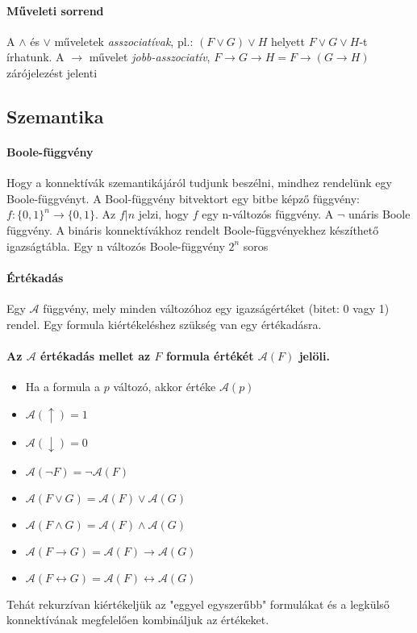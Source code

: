 \documentclass[10pt,a4paper]{article}
\begin{document}
\paragraph{Műveleti sorrend}
A $\wedge$ és $\vee$ műveletek \textit{asszociatívak}, pl.: $(F \vee G) \vee H$ helyett $F \vee G \vee H$-t írhatunk. A $\rightarrow$ művelet \textit{jobb-asszociatív}, $F \rightarrow G \rightarrow H = F \rightarrow ( G \rightarrow H)$ zárójelezést jelenti
\subsection{Szemantika}
\paragraph{Boole-függvény}
Hogy a konnektívák szemantikájáról tudjunk beszélni, mindhez rendelünk egy Boole-függvényt. A Bool-függvény bitvektort egy bitbe képző függvény: $f: \{0,1\}^{n} \rightarrow \{0,1\}.$ \newline
Az $f|n$ jelzi, hogy $f$ egy n-változós függvény. A $\neg$ unáris Boole függvény. A bináris konnektívákhoz rendelt Boole-függvényekhez készíthető igazságtábla. Egy n változós  Boole-függvény $2^{n}$ soros
\paragraph{Értékadás}
Egy $\mathcal{A}$ függvény, mely minden változóhoz egy igazságértéket (bitet: 0 vagy 1) rendel. Egy formula kiértékeléshez szükség van egy értékadásra. \newline
\paragraph{Az $\mathcal{A}$ értékadás mellet az $F$ formula értékét $\mathcal{A}(F)$ jelöli.}
\begin{itemize}
\item Ha a formula a $p$ változó, akkor értéke $\mathcal{A}(p)$
\item $\mathcal{A}(\uparrow) = 1$
\item $\mathcal{A}(\downarrow) = 0$
\item $\mathcal{A}(\neg F) = \neg \mathcal{A}(F)$
\item $\mathcal{A}(F \vee G) = \mathcal{A}(F) \vee \mathcal{A}(G)$
\item $\mathcal{A}(F \wedge G) = \mathcal{A}(F) \wedge \mathcal{A}(G)$
\item $\mathcal{A}(F \rightarrow G) = \mathcal{A}(F) \rightarrow \mathcal{A}(G)$
\item $\mathcal{A}(F \leftrightarrow G) = \mathcal{A}(F) \leftrightarrow \mathcal{A}(G)$
\end{itemize}
Tehát rekurzívan kiértékeljük az "eggyel egyszerűbb" formulákat és a legkülső konnektívának megfelelően kombináljuk az értékeket.
\end{document}
